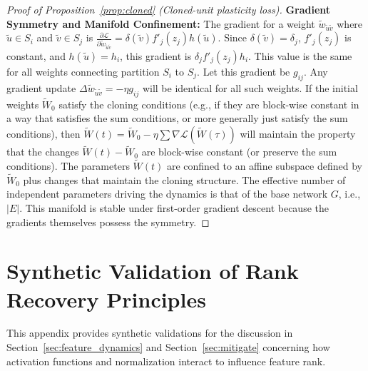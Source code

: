 \documentclass{article}
\newcommand{\Loss}{\mathcal{L}}
\begin{document}
\begin{proof}[Proof of Proposition~\ref{prop:cloned} (Cloned-unit plasticity loss)]
\textbf{Gradient Symmetry and Manifold Confinement:}
The gradient for a weight $\widetilde{w}_{\widetilde{u}\widetilde{v}}$ where $\widetilde{u} \in S_i$ and $\widetilde{v} \in S_j$ is $\frac{\partial\Loss}{\partial \widetilde{w}_{\widetilde{u}\widetilde{v}}} = \delta(\widetilde{v}) f'_j(z_j) h(\widetilde{u})$.
Since $\delta(\widetilde{v})=\delta_j$, $f'_j(z_j)$ is constant, and $h(\widetilde{u})=h_i$, this gradient is $\delta_j f'_j(z_j) h_i$. This value is the same for all weights connecting partition $S_i$ to $S_j$. Let this gradient be $g_{ij}$.
Any gradient update $\Delta \widetilde{w}_{\widetilde{u}\widetilde{v}} = -\eta g_{ij}$ will be identical for all such weights.
If the initial weights $\widetilde{W}_0$ satisfy the cloning conditions (e.g., if they are block-wise constant in a way that satisfies the sum conditions, or more generally just satisfy the sum conditions), then $\widetilde{W}(t) = \widetilde{W}_0 - \eta \sum \nabla\Loss(\widetilde{W}(\tau))$ will maintain the property that the changes $\widetilde{W}(t) - \widetilde{W}_0$ are block-wise constant (or preserve the sum conditions).
The parameters $\widetilde{W}(t)$ are confined to an affine subspace defined by $\widetilde{W}_0$ plus changes that maintain the cloning structure. The effective number of independent parameters driving the dynamics is that of the base network $G$, i.e., $|E|$. This manifold is stable under first-order gradient descent because the gradients themselves possess the symmetry.
\end{proof}


\section{Synthetic Validation of Rank Recovery Principles}
\label{app:rank_validation_appendix_label} %

This appendix provides synthetic validations for the discussion in Section~\ref{sec:feature_dynamics} and Section~\ref{sec:mitigate} concerning how activation functions and normalization interact to influence feature rank.
\end{document}
